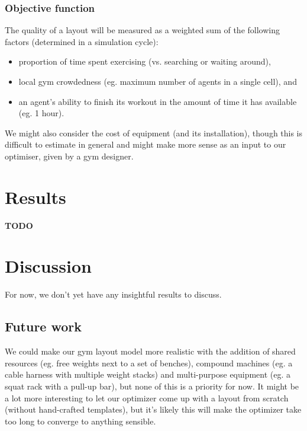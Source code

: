 \documentclass[9pt]{pnas-new}
\begin{document}
\subsubsection*{Objective function}

The quality of a layout will be measured as a weighted sum of the following factors (determined in a simulation cycle): 
\begin{itemize}
	\item proportion of time spent exercising (vs. searching or waiting around),
	\item local gym crowdedness (eg. maximum number of agents in a single cell), and
	\item an agent's ability to finish its workout in the amount of time it has available (eg. 1 hour).
\end{itemize}
We might also consider the cost of equipment (and its installation), though this is difficult to estimate in general and might make more sense as an input to our optimiser, given by a gym designer.


\section*{Results}
\textbf{TODO} %


\section*{Discussion}

For now, we don't yet have any insightful results to discuss.

\subsection*{Future work} 

We could make our gym layout model more realistic with the addition of shared resources (eg. free weights next to a set of benches), compound machines (eg. a cable harness with multiple weight stacks) and multi-purpose equipment (eg. a squat rack with a pull-up bar), but none of this is a priority for now.
It might be a lot more interesting to let our optimizer come up with a layout from scratch (without hand-crafted templates), but it's likely this will make the optimizer take too long to converge to anything sensible.
\end{document}
